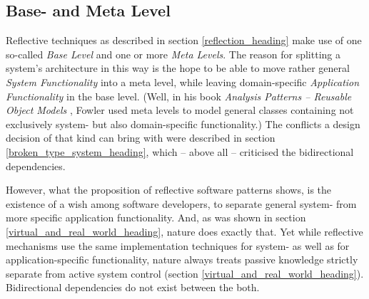 %
%
%
%
%
%
%

\subsection{Base- and Meta Level}
\label{base_and_meta_level_heading}

Reflective techniques as described in section \ref{reflection_heading} make use
of one so-called \emph{Base Level} and one or more \emph{Meta Levels}. The
reason for splitting a system's architecture in this way is the hope to be able
to move rather general \emph{System Functionality} into a meta level, while
leaving domain-specific \emph{Application Functionality} in the base level.
(Well, in his book \emph{Analysis Patterns -- Reusable Object Models}
\cite{fowler1997}, Fowler used meta levels to model general classes containing
not exclusively system- but also domain-specific functionality.) The conflicts
a design decision of that kind can bring with were described in section
\ref{broken_type_system_heading}, which -- above all -- criticised the
bidirectional dependencies.

However, what the proposition of reflective software patterns shows, is the
existence of a wish among software developers, to separate general system- from
more specific application functionality. And, as was shown in section
\ref{virtual_and_real_world_heading}, nature does exactly that. Yet while
reflective mechanisms use the same implementation techniques for system- as
well as for application-specific functionality, nature always treats passive
knowledge strictly separate from active system control (section
\ref{virtual_and_real_world_heading}). Bidirectional dependencies do not exist
between the both.

